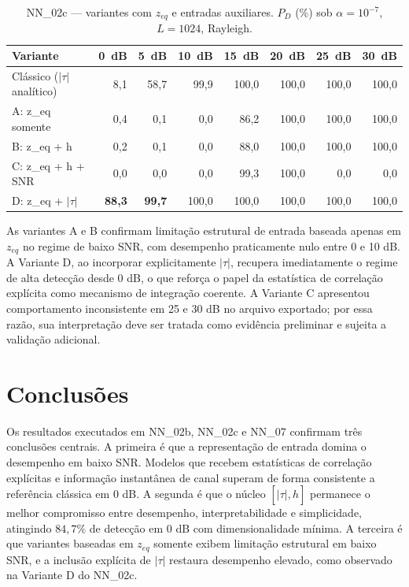 \documentclass[12pt,a4paper]{article}
\begin{document}
\begin{table}[htb]
\caption{\label{tab:zeq_ablation}NN\_02c --- variantes com $z_{eq}$ e entradas auxiliares. $P_D$ (\%) sob $\alpha=10^{-7}$, $L=1024$, Rayleigh.}
\begin{center}
{\footnotesize
\begin{tabular}{lrrrrrrr}\toprule
Variante & 0~dB & 5~dB & 10~dB & 15~dB & 20~dB & 25~dB & 30~dB \\\midrule
Clássico ($|\tau|$ analítico) & 8{,}1 & 58{,}7 & 99{,}9 & 100{,}0 & 100{,}0 & 100{,}0 & 100{,}0 \\\midrule
A: z\_eq somente             & 0{,}4 & 0{,}1 & 0{,}0 & 86{,}2 & 100{,}0 & 100{,}0 & 100{,}0 \\
B: z\_eq + h                 & 0{,}2 & 0{,}1 & 0{,}0 & 88{,}0 & 100{,}0 & 100{,}0 & 100{,}0 \\
C: z\_eq + h + SNR           & 0{,}0 & 0{,}0 & 0{,}0 & 99{,}3 & 100{,}0 & 0{,}0 & 0{,}0 \\
D: z\_eq + $|\tau|$          & \textbf{88{,}3} & \textbf{99{,}7} & 100{,}0 & 100{,}0 & 100{,}0 & 100{,}0 & 100{,}0 \\\bottomrule
\end{tabular}
}
\end{center}
\end{table}

As variantes A e B confirmam limitação estrutural de entrada baseada apenas em $z_{eq}$ no regime de baixo SNR, com desempenho praticamente nulo entre 0 e 10 dB. A Variante D, ao incorporar explicitamente $|\tau|$, recupera imediatamente o regime de alta detecção desde 0 dB, o que reforça o papel da estatística de correlação explícita como mecanismo de integração coerente. A Variante C apresentou comportamento inconsistente em 25 e 30 dB no arquivo exportado; por essa razão, sua interpretação deve ser tratada como evidência preliminar e sujeita a validação adicional.

\section{Conclusões}\label{sec:conclusions}

Os resultados executados em NN\_02b, NN\_02c e NN\_07 confirmam três conclusões centrais. A primeira é que a representação de entrada domina o desempenho em baixo SNR. Modelos que recebem estatísticas de correlação explícitas e informação instantânea de canal superam de forma consistente a referência clássica em 0 dB. A segunda é que o núcleo $[|\tau|,\hat{h}]$ permanece o melhor compromisso entre desempenho, interpretabilidade e simplicidade, atingindo $84{,}7\%$ de detecção em 0 dB com dimensionalidade mínima. A terceira é que variantes baseadas em $z_{eq}$ somente exibem limitação estrutural em baixo SNR, e a inclusão explícita de $|\tau|$ restaura desempenho elevado, como observado na Variante D do NN\_02c.
\end{document}
